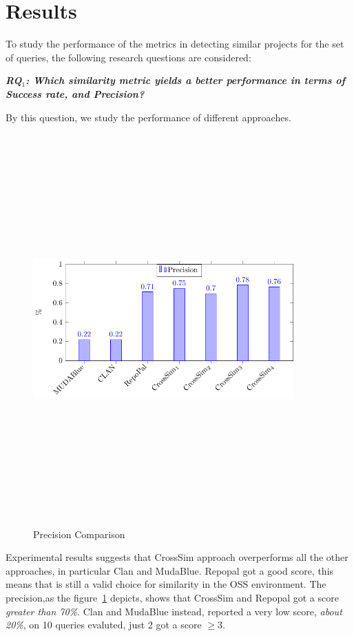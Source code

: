 \section{Results} \label{sec:Results}

To study the performance of the metrics in detecting similar projects for the set of queries, the following research questions are considered:

\newcommand{\rqfirst}{RQ$_1$: Which similarity metric yields a better performance in terms of Success rate, and Precision?}\textit{\textbf{\rqfirst}} 

By this question, we study the performance of different approaches.

\begin{figure}[!h]
\includegraphics[width=10cm,height=15cm,keepaspectratio]{images/Precision.pdf}
\centering
\caption{Precision Comparison}
\label{fig:PrecisionC}
\end{figure}

Experimental results suggests that CrossSim approach overperforms all the other approaches, in particular Clan and MudaBlue.
Repopal got a good score, this means that is still a valid choice for similarity in the OSS environment.
The precision,as the figure~\ref{fig:PrecisionC} depicts, shows that CrossSim and Repopal got a score \emph{greater than 70\%}.
Clan and MudaBlue instead, reported a very low score, \emph{about 20\%}, on 10 queries evaluted, just 2 got a score \emph{$\geq3$}.

